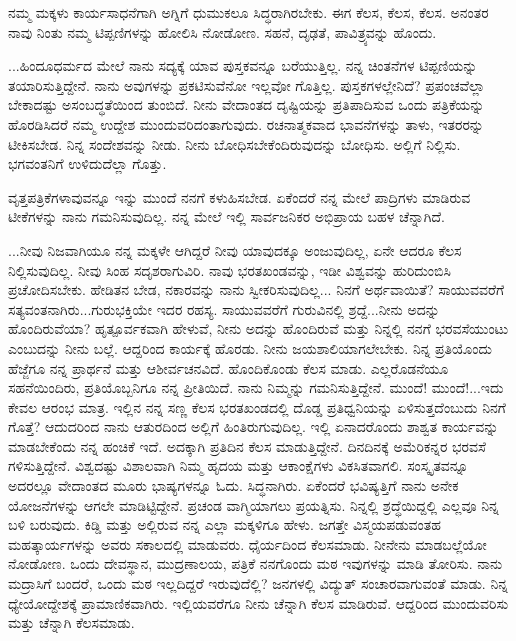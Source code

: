 ನಮ್ಮ ಮಕ್ಕಳು ಕಾರ್ಯಸಾಧನೆಗಾಗಿ ಅಗ್ನಿಗೆ ಧುಮುಕಲೂ ಸಿದ್ಧರಾಗಿರಬೇಕು. ಈಗ ಕೆಲಸ, ಕೆಲಸ, ಕೆಲಸ. ಅನಂತರ ನಾವು ನಿಂತು ನಮ್ಮ ಟಿಪ್ಪಣಿಗಳನ್ನು ಹೋಲಿಸಿ ನೋಡೋಣ. ಸಹನೆ, ದೃಢತೆ, ಪಾವಿತ್ರ್ಯವನ್ನು ಹೊಂದು.

\newpage

...ಹಿಂದೂಧರ್ಮದ ಮೇಲೆ ನಾನು ಸದ್ಯಕ್ಕೆ ಯಾವ ಪುಸ್ತಕವನ್ನೂ ಬರೆಯುತ್ತಿಲ್ಲ. ನನ್ನ ಚಿಂತನೆಗಳ ಟಿಪ್ಪಣಿಯನ್ನು ತಯಾರಿಸುತ್ತಿದ್ದೇನೆ. ನಾನು ಅವುಗಳನ್ನು ಪ್ರಕಟಿಸುವೆನೋ ಇಲ್ಲವೋ ಗೊತ್ತಿಲ್ಲ. ಪುಸ್ತಕಗಳಲ್ಲೇನಿದೆ? ಪ್ರಪಂಚವೆಲ್ಲಾ ಬೇಕಾದಷ್ಟು ಅಸಂಬದ್ಧತೆಯಿಂದ ತುಂಬಿದೆ. ನೀನು ವೇದಾಂತದ ದೃಷ್ಟಿಯನ್ನು ಪ್ರತಿಪಾದಿಸುವ ಒಂದು ಪತ್ರಿಕೆಯನ್ನು ಹೊರಡಿಸಿದರೆ ನಮ್ಮ ಉದ್ದೇಶ ಮುಂದುವರಿದಂತಾಗುವುದು. ರಚನಾತ್ಮಕವಾದ ಭಾವನೆಗಳನ್ನು ತಾಳು, ಇತರರನ್ನು ಟೀಕಿಸಬೇಡ. ನಿನ್ನ ಸಂದೇಶವನ್ನು ನೀಡು. ನೀನು ಬೋಧಿಸಬೇಕೆಂದಿರುವುದನ್ನು ಬೋಧಿಸು. ಅಲ್ಲಿಗೆ ನಿಲ್ಲಿಸು. ಭಗವಂತನಿಗೆ ಉಳಿದುದೆಲ್ಲಾ ಗೊತ್ತು.

ವೃತ್ತಪತ್ರಿಕೆಗಳಾವುವನ್ನೂ ಇನ್ನು ಮುಂದೆ ನನಗೆ ಕಳುಹಿಸಬೇಡ. ಏಕೆಂದರೆ ನನ್ನ ಮೇಲೆ ಪಾದ್ರಿಗಳು ಮಾಡಿರುವ ಟೀಕೆಗಳನ್ನು ನಾನು ಗಮನಿಸುವುದಿಲ್ಲ. ನನ್ನ ಮೇಲೆ ಇಲ್ಲಿ ಸಾರ್ವಜನಿಕರ ಅಭಿಪ್ರಾಯ ಬಹಳ ಚೆನ್ನಾಗಿದೆ.

...ನೀವು ನಿಜವಾಗಿಯೂ ನನ್ನ ಮಕ್ಕಳೇ ಆಗಿದ್ದರೆ ನೀವು ಯಾವುದಕ್ಕೂ ಅಂಜುವುದಿಲ್ಲ, ಏನೇ ಆದರೂ ಕೆಲಸ ನಿಲ್ಲಿಸುವುದಿಲ್ಲ. ನೀವು ಸಿಂಹ ಸದೃಶರಾಗುವಿರಿ. ನಾವು ಭರತಖಂಡವನ್ನು, ಇಡೀ ವಿಶ್ವವನ್ನು ಹುರಿದುಂಬಿಸಿ ಪ್ರಚೋದಿಸಬೇಕು. ಹೇಡಿತನ ಬೇಡ, ನಕಾರವನ್ನು ನಾನು ಸ್ವೀಕರಿಸುವುದಿಲ್ಲ... ನಿನಗೆ ಅರ್ಥವಾಯಿತೆ? ಸಾಯುವವರೆಗೆ ಸತ್ಯವಂತನಾಗಿರು...ಗುರುಭಕ್ತಿಯೇ ಇದರ ರಹಸ್ಯ. ಸಾಯುವವರೆಗೆ ಗುರುವಿನಲ್ಲಿ ಶ್ರದ್ದೆ...ನೀನು ಅದನ್ನು ಹೊಂದಿರುವೆಯಾ? ಹೃತ್ಪೂರ್ವಕವಾಗಿ ಹೇಳುವೆ, ನೀನು ಅದನ್ನು ಹೊಂದಿರುವೆ ಮತ್ತು ನಿನ್ನಲ್ಲಿ ನನಗೆ ಭರವಸೆಯುಂಟು ಎಂಬುದನ್ನು ನೀನು ಬಲ್ಲೆ. ಆದ್ದರಿಂದ ಕಾರ್ಯಕ್ಕೆ ಹೊರಡು. ನೀನು ಜಯಶಾಲಿಯಾಗಲೇಬೇಕು. ನಿನ್ನ ಪ್ರತಿಯೊಂದು ಹೆಜ್ಜೆಗೂ ನನ್ನ ಪ್ರಾರ್ಥನೆ ಮತ್ತು ಆಶೀರ್ವಚನವಿದೆ. ಹೊಂದಿಕೊಂಡು ಕೆಲಸ ಮಾಡು. ಎಲ್ಲರೊಡನೆಯೂ ಸಹನೆಯಿಂದಿರು, ಪ್ರತಿಯೊಬ್ಬನಿಗೂ ನನ್ನ ಪ್ರೀತಿಯಿದೆ. ನಾನು ನಿಮ್ಮನ್ನು ಗಮನಿಸುತ್ತಿದ್ದೇನೆ. ಮುಂದೆ! ಮುಂದೆ!...ಇದು ಕೇವಲ ಆರಂಭ ಮಾತ್ರ. ಇಲ್ಲಿನ ನನ್ನ ಸಣ್ಣ ಕೆಲಸ ಭರತಖಂಡದಲ್ಲಿ ದೊಡ್ಡ ಪ್ರತಿಧ್ವನಿಯನ್ನು ಏಳಿಸುತ್ತದೆಂಬುದು ನಿನಗೆ ಗೊತ್ತೆ? ಆದುದರಿಂದ ನಾನು ಆತುರದಿಂದ ಅಲ್ಲಿಗೆ ಹಿಂತಿರುಗುವುದಿಲ್ಲ. ಇಲ್ಲಿ ಏನಾದರೊಂದು ಶಾಶ್ವತ ಕಾರ್ಯವನ್ನು ಮಾಡಬೇಕೆಂದು ನನ್ನ ಹಂಚಿಕೆ ಇದೆ. ಅದಕ್ಕಾಗಿ ಪ್ರತಿದಿನ ಕೆಲಸ ಮಾಡುತ್ತಿದ್ದೇನೆ. ದಿನದಿನಕ್ಕೆ ಅಮೆರಿಕನ್ನರ ಭರವಸೆ ಗಳಿಸುತ್ತಿದ್ದೇನೆ. ವಿಶ್ವದಷ್ಟು ವಿಶಾಲವಾಗಿ ನಿಮ್ಮ ಹೃದಯ ಮತ್ತು ಆಕಾಂಕ್ಷೆಗಳು ವಿಕಸಿತವಾಗಲಿ. ಸಂಸ್ಕೃತವನ್ನೂ ಅದರಲ್ಲೂ ವೇದಾಂತದ ಮೂರು ಭಾಷ್ಯಗಳನ್ನೂ ಓದು. ಸಿದ್ಧನಾಗಿರು. ಏಕೆಂದರೆ ಭವಿಷ್ಯತ್ತಿಗೆ ನಾನು ಅನೇಕ ಯೋಜನೆಗಳನ್ನು ಆಗಲೇ ಮಾಡಿಟ್ಟಿದ್ದೇನೆ. ಪ್ರಚಂಡ ವಾಗ್ಮಿಯಾಗಲು ಪ್ರಯತ್ನಿಸು. ನಿನ್ನಲ್ಲಿ ಶ್ರದ್ಧೆಯಿದ್ದಲ್ಲಿ ಎಲ್ಲವೂ ನಿನ್ನ ಬಳಿ ಬರುವುದು. ಕಿಡ್ಡಿ ಮತ್ತು ಅಲ್ಲಿರುವ ನನ್ನ ಎಲ್ಲಾ ಮಕ್ಕಳಿಗೂ ಹೇಳು. ಜಗತ್ತೇ ವಿಸ್ಮಯಪಡುವಂತಹ ಮಹತ್ಕಾರ್ಯಗಳನ್ನು ಅವರು ಸಕಾಲದಲ್ಲಿ ಮಾಡುವರು. ಧೈರ್ಯದಿಂದ ಕೆಲಸಮಾಡು. ನೀನೇನು ಮಾಡಬಲ್ಲೆಯೋ ನೋಡೋಣ. ಒಂದು ದೇವಸ್ಥಾನ, ಮುದ್ರಣಾಲಯ, ಪತ್ರಿಕೆ ನನಗೊಂದು ಮಠ\enginline{-} ಇವುಗಳನ್ನು ಮಾಡಿ ತೋರಿಸು. ನಾನು ಮದ್ರಾಸಿಗೆ ಬಂದರೆ, ಒಂದು ಮಠ ಇಲ್ಲದಿದ್ದರೆ ಇರುವುದೆಲ್ಲಿ? ಜನಗಳಲ್ಲಿ ವಿದ್ಯುತ್‌ ಸಂಚಾರವಾಗುವಂತೆ ಮಾಡು. ನಿನ್ನ ಧ್ಯೇಯೋದ್ದೇಶಕ್ಕೆ ಪ್ರಾಮಾಣಿಕವಾಗಿರು. ಇಲ್ಲಿಯವರೆಗೂ ನೀನು ಚೆನ್ನಾಗಿ ಕೆಲಸ ಮಾಡಿರುವೆ. ಆದ್ದರಿಂದ ಮುಂದುವರಿಸು ಮತ್ತು ಚೆನ್ನಾಗಿ ಕೆಲಸಮಾಡು.


